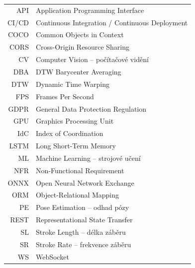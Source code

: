 \documentclass[czech,master,twoside]{ctufit-thesis}
\begin{document}
\begin{tabular}{rl}
	API   & Application Programming Interface \\
	CI/CD & Continuous Integration / Continuous Deployment \\
	COCO  & Common Objects in Context \\
	CORS  & Cross-Origin Resource Sharing \\
	CV    & Computer Vision -- počítačové vidění \\
	DBA   & DTW Barycenter Averaging \\
	DTW   & Dynamic Time Warping \\
	FPS   & Frames Per Second \\
	GDPR  & General Data Protection Regulation \\
	GPU   & Graphics Processing Unit \\
	IdC   & Index of Coordination \\
	LSTM  & Long Short-Term Memory \\
	ML    & Machine Learning -- strojové učení \\
	NFR   & Non-Functional Requirement \\
	ONNX  & Open Neural Network Exchange \\
	ORM   & Object-Relational Mapping \\
	PE    & Pose Estimation -- odhad pózy \\
	REST  & Representational State Transfer \\
	SL    & Stroke Length -- délka záběru \\
	SR    & Stroke Rate -- frekvence záběru \\
	WS    & WebSocket \\
\end{tabular}

\resumeTOCentries

\tableofcontents
\listoffigures
\begingroup
\let\clearpage\relax
\listoftables
\endgroup

\mainmatter\mainmatterinit









\appendix\appendixinit



\backmatter

\printbibliography[heading=bibintoc]
\end{document}
